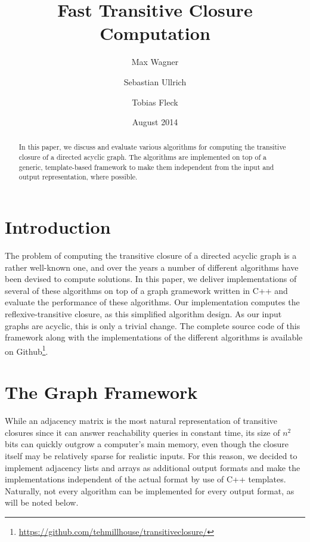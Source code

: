 \documentclass[12pt,a4paper,twoside]{article}
\begin{document}
\title{Fast Transitive Closure Computation}
\author{Max Wagner \and Sebastian Ullrich \and Tobias Fleck}
\date{August 2014}
\maketitle

\def\sectionautorefname{Section}
\def\subsectionautorefname{Subsection}

\newcommand\ie{i.e.\ }
\newcommand\eg{e.g.,\ }
\newcommand\credits[1]{\begin{flushright}\emph{#1}\end{flushright}}

\begin{abstract}
  In this paper, we discuss and evaluate various algorithms for computing the transitive closure of a directed acyclic graph. The algorithms are implemented on top of a generic, template-based framework to make them independent from the input and output representation, where possible.
\end{abstract}

\section{Introduction}

The problem of computing the transitive closure of a directed acyclic graph is a rather well-known one, and over the years a number of different algorithms have been devised to compute solutions. In this paper, we deliver implementations of several of these algorithms on top of a graph gramework written in C++ and evaluate the performance of these algorithms. Our implementation computes the reflexive-transitive closure, as this simplified algorithm design. As our input graphs are acyclic, this is only a trivial change. The complete source code of this framework along with the implementations of the different algorithms is available on Github\footnote{\url{https://github.com/tehmillhouse/transitiveclosure/}}.

\section{The Graph Framework}

While an adjacency matrix is the most natural representation of transitive closures since it can answer reachability queries in constant time, its size of $n^2$ bits can quickly outgrow a computer's main memory, even though the closure itself may be relatively sparse for realistic inputs. For this reason, we decided to implement adjacency lists and arrays as additional output formats and make the implementations independent of the actual format by use of C++ templates. Naturally, not every algorithm can be implemented for every output format, as will be noted below.
\end{document}
